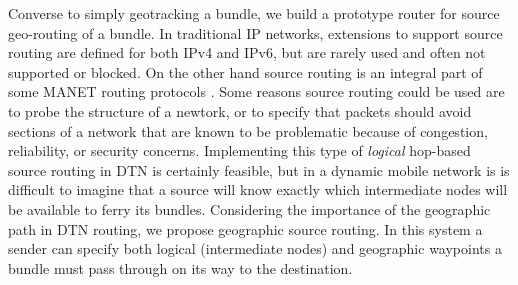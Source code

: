 {\color{blue}



Converse to simply geotracking a bundle, we build a prototype router for source geo-routing of a bundle.  In traditional IP networks, extensions to support source routing are defined for both IPv4 and IPv6, but are rarely used and often not supported or blocked.  On the other hand source routing is an integral part of some MANET routing protocols \cite{some-DSR-paper}.  Some reasons source routing could be used are to probe the structure of a newtork, or to specify that packets should avoid sections of a network that are known to be problematic because of congestion, reliability, or security concerns.  Implementing this type of {\it logical} hop-based source routing in DTN is certainly feasible, but in a dynamic mobile network is is difficult to imagine that a source will know exactly which intermediate nodes will be available to ferry its bundles.  Considering the importance of the geographic path in DTN routing, we propose geographic source routing.  In this system a sender can specify both logical (intermediate nodes) and geographic waypoints a bundle must pass through on its way to the destination.

}
